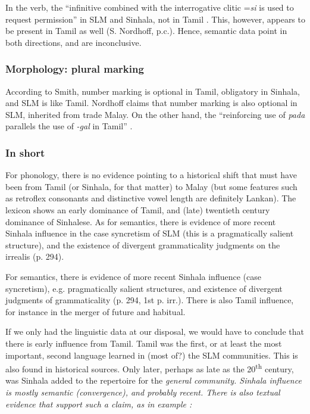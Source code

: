 In the verb, the ``infinitive combined with the interrogative clitic =\textit{si} is used to request permission'' in SLM and Sinhala, not in Tamil \citep[280]{Nordhoff2009}. This, however, appears to be present in Tamil as well (S. Nordhoff, p.c.). Hence, semantic data point in both directions, and are inconclusive.


\subsubsection{Morphology: plural marking} \label{sec:bakker:414}
According to Smith, number marking is optional in Tamil, obligatory in Sinhala, and SLM is like Tamil. Nordhoff claims that number marking is also optional in SLM, inherited from trade Malay. On the other hand, the ``reinforcing use of \textit{pada} parallels the use of \textit{-gal} in Tamil'' \citep[Mr. X, Mr. Y, Mr. Z \textit{pada}, ][324]{Nordhoff2009}.

\subsubsection{In short}\label{bakker:sec:415}
For phonology, there is no evidence pointing to a historical shift that must have been from Tamil (or Sinhala, for that matter) to Malay (but some features such as retroflex consonants and distinctive vowel length are definitely Lankan). The lexicon shows an early dominance of Tamil, and (late) twentieth century dominance of Sinhalese. 
As for semantics, there is evidence of more recent Sinhala influence in the  case   syncretism of SLM (this is a   pragmatically salient structure), and the existence of   divergent grammaticality judgments  on the irrealis  (p. 294).
 

For semantics, there is evidence of more recent Sinhala influence (case syncretism), e.g. pragmatically salient structures, and existence of divergent judgments of grammaticality (p. 294, 1st p. irr.). There is also Tamil influence, for instance in the merger of future and habitual. 

If we only had the linguistic data at our disposal, we would have to conclude that there is early influence from Tamil. Tamil was the first, or at least the most important, second language learned in (most of?) the SLM communities. This is also found in historical sources. Only later, perhaps as late as the 20\textsuperscript{th} century, was Sinhala added to the repertoire for the \em general \em community. Sinhala influence is mostly semantic (convergence), and probably recent. There is also textual evidence that support such a claim, as in example  \citep[257]{Nordhoff2009}: 

